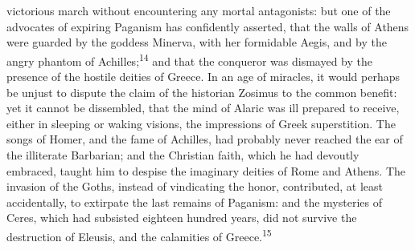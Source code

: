 victorious march without encountering any mortal antagonists: but
one of the advocates of expiring Paganism has confidently
asserted, that the walls of Athens were guarded by the goddess
Minerva, with her formidable Aegis, and by the angry phantom of
Achilles;\textsuperscript{14} and that the conqueror was dismayed by the presence
of the hostile deities of Greece. In an age of miracles, it would
perhaps be unjust to dispute the claim of the historian Zosimus
to the common benefit: yet it cannot be dissembled, that the mind
of Alaric was ill prepared to receive, either in sleeping or
waking visions, the impressions of Greek superstition. The songs
of Homer, and the fame of Achilles, had probably never reached
the ear of the illiterate Barbarian; and the Christian faith,
which he had devoutly embraced, taught him to despise the
imaginary deities of Rome and Athens. The invasion of the Goths,
instead of vindicating the honor, contributed, at least
accidentally, to extirpate the last remains of Paganism: and the
mysteries of Ceres, which had subsisted eighteen hundred years,
did not survive the destruction of Eleusis, and the calamities of
Greece.\textsuperscript{15}





